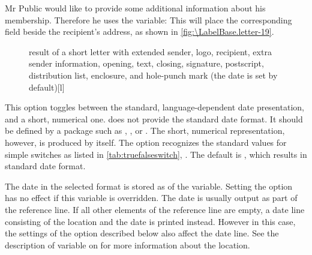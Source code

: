 \begin{Example}
  Mr Public would like to provide some additional information about his
  membership. Therefore he uses the  variable:%
  This will place the corresponding field beside the recipient's address, as
  shown in \autoref{fig:\LabelBase.letter-19}.
  \begin{figure}
    \setcapindent{0pt}%
    \begin{captionbeside}
      {result of a short letter with extended sender, logo, recipient,
        extra sender information, opening, text, closing, signature,
        postscript, distribution list, enclosure, and hole-punch mark (the
        date is set by default)}[l]
    \end{captionbeside}
    \label{fig:\LabelBase.letter-19}
  \end{figure}
\end{Example}
\EndIndexGroup
\EndIndexGroup


\begin{Declaration}
\end{Declaration}
This option toggles between the standard, language-dependent
date presentation, and a short, numerical
one. \KOMAScript{} does not provide the standard date format. It should be
defined by a package such as ,
, or
.
The short, numerical
representation, however, is produced by  itself. The option
recognizes the standard values for simple switches as listed in
\autoref{tab:truefalseswitch}, . The default
is , which results in standard date format.

\begin{Declaration}
\end{Declaration}
The date in the selected format is stored as  of the
 variable. Setting the
 option has no effect if this
variable is overridden. The date is usually output as part of the reference
line. If all other elements of the reference line are empty, a date line
consisting of the location and the date is printed instead. However in this
case, the settings of the  option described
below also affect the date line. See the description of variable
 on
 for more information about
the location.
%
\EndIndexGroup
\EndIndexGroup


